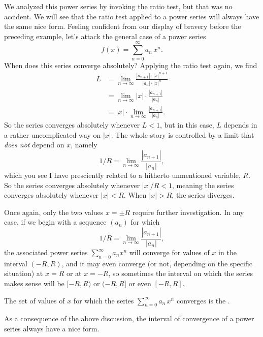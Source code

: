 We analyzed this power series by invoking the ratio test, but that was no
accident.  We will see that the ratio test applied to a power series
will always have the same nice form.  Feeling confident from our
display of bravery before the preceding example, let's attack the
general case of a power series
$$
f(x) = \sum_{n=0}^\infty a_n\, x^n.
$$
When does this series converge absolutely?  Applying the ratio test again, we find
\begin{align*}
  L &= \lim_{n\to\infty} \frac{|a_{n+1}| \cdot |x|^{n+1}}{|a_n| \cdot |x|^{n}} \\
  &= \lim_{n\to\infty} |x| \cdot \frac{|a_{n+1}|}{|a_n|} \\
  &= |x| \cdot \lim_{n\to\infty} \frac{|a_{n+1}|}{|a_n|}.
\end{align*}
So the series converges absolutely whenever $L < 1$, but in this case, $L$ depends in a rather uncomplicated way on $|x|$.  The whole story is controlled by a limit that \textit{does not} depend on $x$, namely
$$
  1/R = \lim_{n\to\infty} \frac{|a_{n+1}|}{|a_n|},
$$
which you see I have presciently related to a hitherto unmentioned
variable, $R$.  So the series converges absolutely whenever $|x| / R <
1$, meaning the series converges absolutely whenever $|x| < R$.  When
$|x| > R$, the series diverges.

Once again, only the two values $x=\pm R$ require further
investigation.  In any case, if we begin with a sequence $(a_n)$ for which
$$
  1/R = \lim_{n\to\infty} \frac{|a_{n+1}|}{|a_n|},
$$
the associated power series $\sum_{n=0}^\infty a_n x^n$ will converge
for values of $x$ in the interval $(-R,R)$, and it may even converge
(or not, depending on the specific situation) at $x = R$ or at $x =
-R$, so sometimes the interval on which the series makes sense will be
$[-R,R)$ or $(-R,R]$ or even $[-R,R]$.

\begin{definition}
  The set of values of $x$ for which the series $\sum_{n=0}^\infty a_n \, x^n$ converges is the
  .
\end{definition}

As a consequence of the above discussion, the interval of convergence
of a power series always have a nice form.

